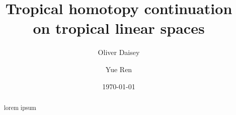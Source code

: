 \documentclass[12pt,reqno,a4paper]{amsart}
\theoremstyle{theoremstyle}
\theoremstyle{examplestyle}
\theoremstyle{algorithmstyle}
\begin{document}
\title[Tropical homotopy continuation on tropical linear spaces]{Tropical homotopy continuation\\ on tropical linear spaces}
\author{Oliver Daisey}
\address{Department of Mathematics, Durham University, United Kingdom.}
\author{Yue Ren}
\address{Department of Mathematics, Durham University, United Kingdom.}


\date{\today}


\begin{abstract}
  lorem ipsum
\end{abstract}

\maketitle









\renewcommand*{\bibfont}{\small}
\printbibliography
\end{document}
